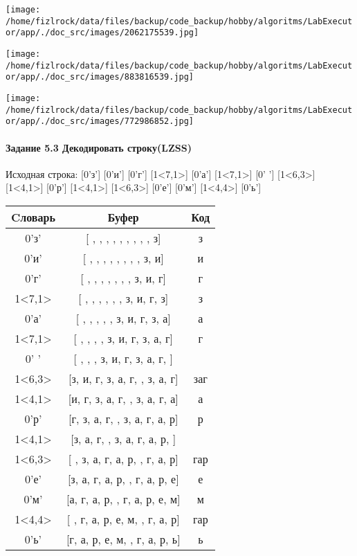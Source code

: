 \documentclass[a4paper, 12pt]{article}
\begin{document}
\texttt{[image: /home/fizlrock/data/files/backup/code\_backup/hobby/algoritms/LabExecutor/app/./doc\_src/images/2062175539.jpg]}

\texttt{[image: /home/fizlrock/data/files/backup/code\_backup/hobby/algoritms/LabExecutor/app/./doc\_src/images/883816539.jpg]}

\texttt{[image: /home/fizlrock/data/files/backup/code\_backup/hobby/algoritms/LabExecutor/app/./doc\_src/images/772986852.jpg]}
\pagebreak
\paragraph{Задание 5.3 Декодировать строку(LZSS)\\}

Исходная строка: [0'з'] [0'и'] [0'г'] [1<7,1>] [0'а'] [1<7,1>] [0' '] [1<6,3>] [1<4,1>] [0'р'] [1<4,1>] [1<6,3>] [0'е'] [0'м'] [1<4,4>] [0'ь']\\
\begin{table}[h!]
\centering
\begin{tabular}{|c|c|c|}
\hline
 Cловарь & Буфер & Код  \\ \hline
0'з' & [ ,  ,  ,  ,  ,  ,  ,  ,  , з] & з
\\ \hline
0'и' & [ ,  ,  ,  ,  ,  ,  ,  , з, и] & и
\\ \hline
0'г' & [ ,  ,  ,  ,  ,  ,  , з, и, г] & г
\\ \hline
1<7,1> & [ ,  ,  ,  ,  ,  , з, и, г, з] & з
\\ \hline
0'а' & [ ,  ,  ,  ,  , з, и, г, з, а] & а
\\ \hline
1<7,1> & [ ,  ,  ,  , з, и, г, з, а, г] & г
\\ \hline
0' ' & [ ,  ,  , з, и, г, з, а, г,  ] &  
\\ \hline
1<6,3> & [з, и, г, з, а, г,  , з, а, г] & заг
\\ \hline
1<4,1> & [и, г, з, а, г,  , з, а, г, а] & а
\\ \hline
0'р' & [г, з, а, г,  , з, а, г, а, р] & р
\\ \hline
1<4,1> & [з, а, г,  , з, а, г, а, р,  ] &  
\\ \hline
1<6,3> & [ , з, а, г, а, р,  , г, а, р] & гар
\\ \hline
0'е' & [з, а, г, а, р,  , г, а, р, е] & е
\\ \hline
0'м' & [а, г, а, р,  , г, а, р, е, м] & м
\\ \hline
1<4,4> & [ , г, а, р, е, м,  , г, а, р] &  гар
\\ \hline
0'ь' & [г, а, р, е, м,  , г, а, р, ь] & ь
\\ \hline
\end{tabular}
\end{table}
\end{document}
